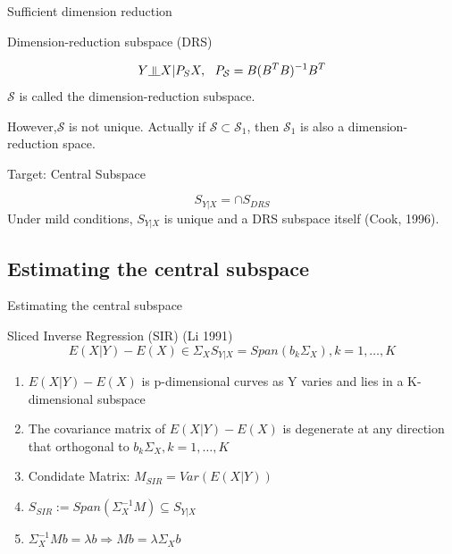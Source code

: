 \documentclass[ignorenonframetext,]{beamer}
\providecommand{\tightlist}{%
  \setlength{\itemsep}{0pt}\setlength{\parskip}{0pt}}
\newcommand{\indep}{\rotatebox[origin=c]{90}{$\models$}}
\begin{document}
\begin{frame}{Sufficient dimension reduction}

\begin{block}{Dimension-reduction subspace (DRS)}

\[
  Y \indep X|P_SX,~~ P_\mathcal{S} = B(B^TB)^{-1}B^T
\] \(\mathcal{S}\) is called the dimension-reduction subspace.

However,\(\mathcal{S}\) is not unique. Actually if
\(\mathcal{S} \subset \mathcal{S}_1\), then \(\mathcal{S}_1\) is also a
dimension-reduction space.

\end{block}

\begin{block}{Target: Central Subspace}

\[
S_{Y|X} = \cap S_{DRS}
\] Under mild conditions, \(S_{Y|X}\) is unique and a DRS subspace
itself (Cook, 1996).

\end{block}

\end{frame}

\subsection{Estimating the central
subspace}\label{estimating-the-central-subspace}

\begin{frame}{Estimating the central subspace}

\begin{block}{Sliced Inverse Regression (SIR) (Li 1991)}
\[
E(X|Y) - E(X) \in \Sigma_XS_{Y|X} = Span(b_k\Sigma_{X}),k = 1, \dots, K
\]
\end{block}

\begin{enumerate}
\def\labelenumi{\arabic{enumi}.}
\tightlist
\item
  \(E(X|Y) - E(X)\) is p-dimensional curves as Y varies and lies in a
  K-dimensional subspace
\item
  The covariance matrix of \(E(X|Y) - E(X)\) is degenerate at any
  direction that orthogonal to \(b_k\Sigma_{X},k = 1, \dots, K\)
\item
  Condidate Matrix: \(M_{SIR} = Var(E(X|Y))\)
\item
  \(S_{SIR} := Span(\Sigma_{X}^{-1}M) \subseteq S_{Y|X}\)
\item
  \(\Sigma_{X}^{-1}Mb = \lambda b \Rightarrow Mb = \lambda\Sigma_{X}b\)
\end{enumerate}

\end{frame}
\end{document}
